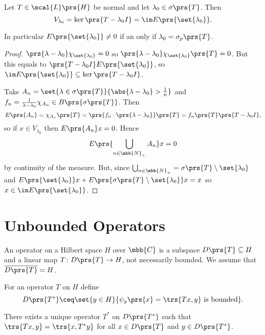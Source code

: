 \documentclass[10pt, twoside]{book}
\begin{document}
\begin{proposition}
Let $T \in \mcal{L}\prs{H}$ be normal and let $\lambda_0 \in \sigma\prs{T}$.
Then
\[V_{\lambda_0} = \ker\prs{T - \lambda_0 I} = \im E \prs{\set{\lambda_0}} \text{.}\]

In particular $E\prs{\set{\lambda_0}} \neq 0$ if an only if $\lambda_0 = \sigma_p\prs{T}$.
\end{proposition}

\begin{proof}
$\prs{\lambda - \lambda_0} \chi_{\set{\lambda_0}} = 0$ so $\prs{\lambda - \lambda_0} \chi_{\set{\lambda_0}} \prs{T} = 0$. But this equals to $\prs{T- \lambda_0 I} E\prs{\set{\lambda_0}}$, so $\im E\prs{\set{\lambda_0}} \subseteq \ker \prs{T - \lambda_0 I}$.

Take $A_n = \set{\lambda \in \sigma\prs{T}}{\abs{\lambda - \lambda_0} > \frac{1}{n}}$ and $f_n = \frac{1}{\lambda - \lambda_0} \chi_{A_n} \in B\prs{\sigma\prs{T}}$. Then
\[E\prs{A_n} = \chi_{A_n}\prs{T} = \prs{f_n \cdot \prs{\lambda - \lambda_0}}\prs{T} = f_n\prs{T} \prs{T - \lambda_0 I} \text{,}\]
so if $x \in V_{\lambda_0}$ then $E\prs{A_n} x = 0$.
Hence
\[E\prs{\bigcup_{n \in \mbb{N}_+} A_n} x = 0\]
by continuity of the measure.
But, since $\bigcup_{n \in \mbb{N}_+} = \sigma\prs{T} \setminus \set{\lambda_0}$ and $E \prs{\set{\lambda_0}} x + E\prs{\sigma\prs{T} \setminus \set{\lambda_0}} x = x$
so $x \in \im E \prs{\set{\lambda_0}}$.
\end{proof}


\chapter{Unbounded Operators}

\begin{definition}
An operator on a Hilbert space $H$ over $\mbb{C}$ is a subspace $D\prs{T} \subseteq H$ and a linear map $T \colon D\prs{T} \to H$, not necessarily bounded.
We assume that $\overline{D\prs{T}} = H$.
\end{definition}

\begin{definition}
For an operator $T$ on $H$ define \[D\prs{T^*} \ceq \set{y \in H}{\psi_y\prs{x} = \trs{Tx, y} \text{ is bounded}} \text{.}\]
\end{definition}

\begin{proposition}
There exists a unique operator $T^*$ on $D\prs{T^*}$ such that $\trs{Tx,y} = \trs{x, T^* y}$ for all $x \in D\prs{T}$ and $y \in D\prs{T^*}$.
\end{proposition}
\end{document}
